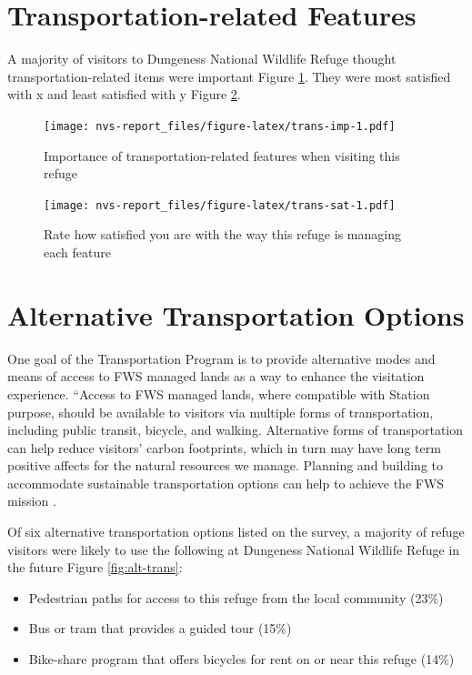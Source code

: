 \documentclass[]{book}
\providecommand{\tightlist}{%
  \setlength{\itemsep}{0pt}\setlength{\parskip}{0pt}}
\begin{document}
\section*{Transportation-related
Features}\label{transportation-related-features}

A majority of visitors to Dungeness National Wildlife Refuge thought
transportation-related items were important Figure \ref{fig:trans-imp}.
They were most satisfied with x and least satisfied with y Figure
\ref{fig:trans-sat}.

\begin{figure}
\centering
\texttt{[image: nvs-report\_files/figure-latex/trans-imp-1.pdf]}
\caption{\label{fig:trans-imp}Importance of transportation-related features
when visiting this refuge}
\end{figure}

\begin{figure}
\centering
\texttt{[image: nvs-report\_files/figure-latex/trans-sat-1.pdf]}
\caption{\label{fig:trans-sat}Rate how satisfied you are with the way this
refuge is managing each feature}
\end{figure}

\section*{Alternative Transportation
Options}\label{alternative-transportation-options}

One goal of the Transportation Program is to provide alternative modes
and means of access to FWS managed lands as a way to enhance the
visitation experience. ``Access to FWS managed lands, where compatible
with Station purpose, should be available to visitors via multiple forms
of transportation, including public transit, bicycle, and walking.
Alternative forms of transportation can help reduce visitors' carbon
footprints, which in turn may have long term positive affects for the
natural resources we manage. Planning and building to accommodate
sustainable transportation options can help to achieve the FWS mission
\citep{USFWS2016b}.

Of six alternative transportation options listed on the survey, a
majority of refuge visitors were likely to use the following at
Dungeness National Wildlife Refuge in the future Figure
\ref{fig:alt-trans}:

\begin{itemize}
\tightlist
\item
  Pedestrian paths for access to this refuge from the local community
  (23\%)
\item
  Bus or tram that provides a guided tour (15\%)
\item
  Bike-share program that offers bicycles for rent on or near this
  refuge (14\%)
\end{itemize}
\end{document}
